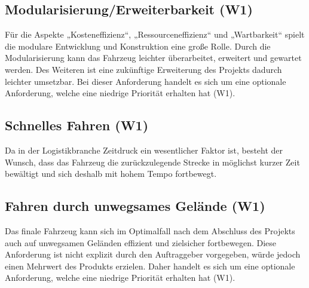 \subsection*{Modularisierung/Erweiterbarkeit (W1)}
Für die Aspekte „Kosteneffizienz“, „Ressourceneffizienz“ und „Wartbarkeit“ spielt die modulare Entwicklung und Konstruktion eine große Rolle. Durch die Modularisierung kann das Fahrzeug leichter überarbeitet, erweitert und gewartet werden. Des Weiteren ist eine zukünftige Erweiterung des Projekts dadurch leichter umsetzbar. Bei dieser Anforderung handelt es sich um eine optionale Anforderung, welche eine niedrige Priorität erhalten hat (W1).

\subsection*{Schnelles Fahren (W1)}
Da in der Logistikbranche Zeitdruck ein wesentlicher Faktor ist, besteht der Wunsch, dass das Fahrzeug die zurückzulegende Strecke in möglichst kurzer Zeit bewältigt und sich deshalb mit hohem Tempo fortbewegt.

\subsection*{Fahren durch unwegsames Gelände (W1)}
Das finale Fahrzeug kann sich im Optimalfall nach dem Abschluss des Projekts auch auf unwegsamen Geländen effizient und zielsicher fortbewegen. Diese Anforderung ist nicht explizit durch den Auftraggeber vorgegeben, würde jedoch einen Mehrwert des Produkts erzielen. Daher handelt es sich um eine optionale Anforderung, welche eine niedrige Priorität erhalten hat (W1).
